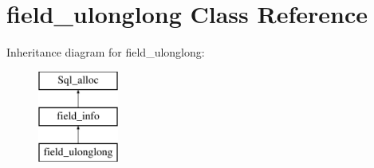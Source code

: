 \hypertarget{classfield__ulonglong}{}\section{field\+\_\+ulonglong Class Reference}
\label{classfield__ulonglong}
Inheritance diagram for field\+\_\+ulonglong\+:\begin{figure}[H]
\begin{center}
\leavevmode
\includegraphics[height=3.000000cm]{classfield__ulonglong}
\end{center}
\end{figure}
